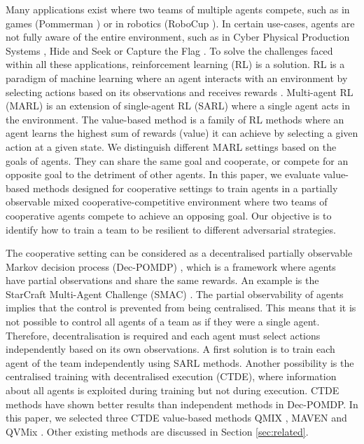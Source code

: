 Many applications exist where two teams of multiple agents compete, such as in games (Pommerman \citep{resnick2018pommerman}) or in robotics (RoboCup \citep{kitano1997robocup}).
In certain use-cases, agents are not fully aware of the entire environment, such as in Cyber Physical Production Systems \citep{phan2020learning}, Hide and Seek \citep{baker2019emergent} or Capture the Flag \citep{jaderberg2019human}.
To solve the challenges faced within all these applications, reinforcement learning (RL) is a solution.
RL is a paradigm of machine learning where an agent interacts with an environment by selecting actions based on its observations and receives rewards \citep{sutton2018reinforcement}.
Multi-agent RL (MARL) is an extension of single-agent RL (SARL) where a single agent acts in the environment.
The value-based method is a family of RL methods where an agent learns the highest sum of rewards (value) it can achieve by selecting a given action at a given state.
We distinguish different MARL settings based on the goals of agents. 
They can share the same goal and cooperate, or compete for an opposite goal to the detriment of other agents.
In this paper, we evaluate value-based methods designed for cooperative settings to train agents in a partially observable mixed cooperative-competitive environment where two teams of cooperative agents compete to achieve an opposing goal. Our objective is to identify how to train a team to be resilient to different adversarial strategies.

The cooperative setting can be considered as a decentralised partially observable Markov decision process (Dec-POMDP) \citep{DecPomdp}, which is a framework where agents have partial observations and share the same rewards.
An example is the StarCraft Multi-Agent Challenge (SMAC) \citep{samvelyan2019starcraft}.
The partial observability of agents implies that the control is prevented from being centralised.
This means that it is not possible to control all agents of a team as if they were a single agent.
Therefore, decentralisation is required and each agent must select actions independently based on its own observations.
A first solution is to train each agent of the team independently using SARL methods.
Another possibility is the centralised training with decentralised execution (CTDE), where information about all agents is exploited during training but not during execution.
CTDE methods have shown better results than independent methods in Dec-POMDP.
In this paper, we selected three CTDE value-based methods QMIX \citep{Rashid2018}, MAVEN \citep{Mahajan2019MAVEN:Exploration} and QVMix \citep{leroy2020qvmix}. Other existing methods are discussed in Section \ref{sec:related}.

